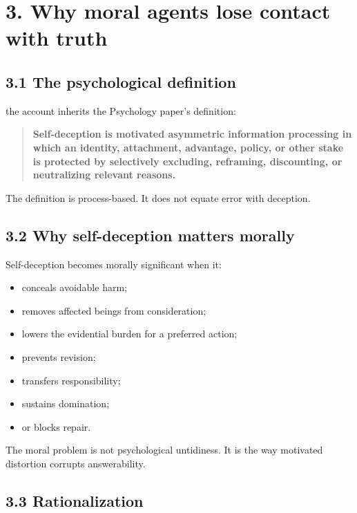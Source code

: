\documentclass[
  11pt,
]{article}
\providecommand{\tightlist}{%
  \setlength{\itemsep}{0pt}\setlength{\parskip}{0pt}}
\begin{document}
\section{3. Why moral agents lose contact with
truth}\label{why-moral-agents-lose-contact-with-truth}

\subsection{3.1 The psychological
definition}\label{the-psychological-definition}

the account inherits the Psychology paper's definition:

\begin{quote}
\textbf{Self-deception is motivated asymmetric information processing in
which an identity, attachment, advantage, policy, or other stake is
protected by selectively excluding, reframing, discounting, or
neutralizing relevant reasons.}
\end{quote}

The definition is process-based. It does not equate error with
deception.

\subsection{3.2 Why self-deception matters
morally}\label{why-self-deception-matters-morally}

Self-deception becomes morally significant when it:

\begin{itemize}
\tightlist
\item
  conceals avoidable harm;
\item
  removes affected beings from consideration;
\item
  lowers the evidential burden for a preferred action;
\item
  prevents revision;
\item
  transfers responsibility;
\item
  sustains domination;
\item
  or blocks repair.
\end{itemize}

The moral problem is not psychological untidiness. It is the way
motivated distortion corrupts answerability.

\subsection{3.3 Rationalization}\label{rationalization}
\end{document}
